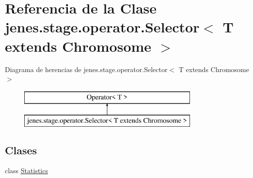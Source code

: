\hypertarget{classjenes_1_1stage_1_1operator_1_1_selector_3_01_t_01extends_01_chromosome_01_4}{\section{Referencia de la Clase jenes.\-stage.\-operator.\-Selector$<$ T extends Chromosome $>$}
\label{classjenes_1_1stage_1_1operator_1_1_selector_3_01_t_01extends_01_chromosome_01_4}
}
Diagrama de herencias de jenes.\-stage.\-operator.\-Selector$<$ T extends Chromosome $>$\begin{figure}[H]
\begin{center}
\leavevmode
\includegraphics[height=2.000000cm]{classjenes_1_1stage_1_1operator_1_1_selector_3_01_t_01extends_01_chromosome_01_4}
\end{center}
\end{figure}
\subsection*{Clases}
\begin{DoxyCompactItemize}
\item 
class \hyperlink{classjenes_1_1stage_1_1operator_1_1_selector_3_01_t_01extends_01_chromosome_01_4_1_1_statistics}{Statistics}
\end{DoxyCompactItemize}
